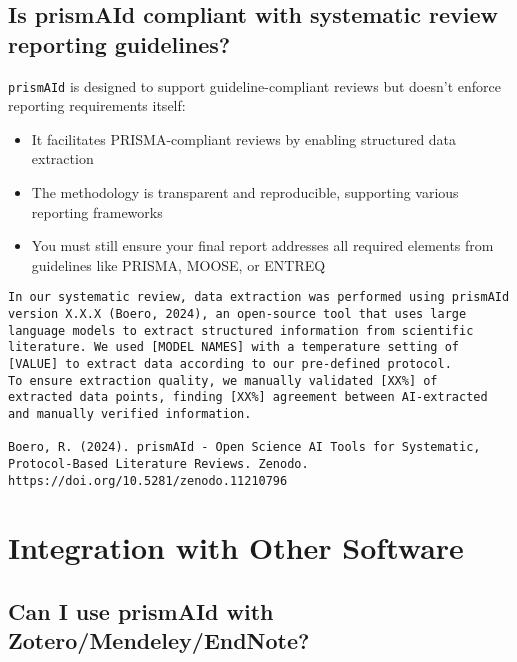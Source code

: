 
\subsection{Is prismAId compliant with systematic review reporting guidelines?}

\texttt{prismAId} is designed to support guideline-compliant reviews but doesn't enforce reporting requirements itself:

\begin{itemize}
    \item It facilitates PRISMA-compliant reviews by enabling structured data extraction
    \item The methodology is transparent and reproducible, supporting various reporting frameworks
    \item You must still ensure your final report addresses all required elements from guidelines like PRISMA, MOOSE, or ENTREQ
\end{itemize}

\begin{commandbox}
\begin{lstlisting}
In our systematic review, data extraction was performed using prismAId
version X.X.X (Boero, 2024), an open-source tool that uses large
language models to extract structured information from scientific
literature. We used [MODEL NAMES] with a temperature setting of
[VALUE] to extract data according to our pre-defined protocol.
To ensure extraction quality, we manually validated [XX%] of
extracted data points, finding [XX%] agreement between AI-extracted
and manually verified information.

Boero, R. (2024). prismAId - Open Science AI Tools for Systematic,
Protocol-Based Literature Reviews. Zenodo.
https://doi.org/10.5281/zenodo.11210796
\end{lstlisting}
\end{commandbox}

\section{Integration with Other Software}

\subsection{Can I use prismAId with Zotero/Mendeley/EndNote?}

